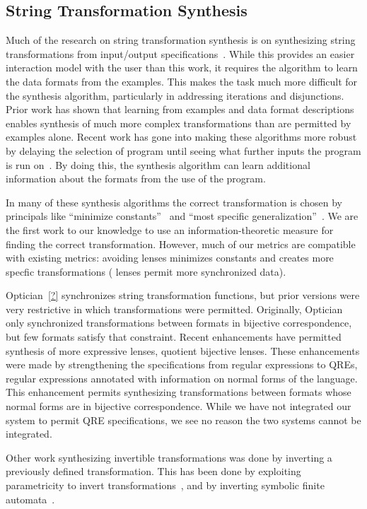 \documentclass[acmsmall,screen,anonymous]{acmart}
\begin{document}
\subsection{String Transformation Synthesis}
Much of the research on string transformation synthesis is on synthesizing
string transformations from input/output
specifications~\cite{flashfill,flashextract,?}. While this provides an easier
interaction model with the user than this work, it requires the algorithm to
learn the data formats from the examples. This makes the task much more
difficult for the synthesis algorithm, particularly in addressing iterations and
disjunctions. Prior work has shown that learning from examples and data format
descriptions enables synthesis of much more complex transformations than are
permitted by examples alone. Recent work has gone into making these algorithms
more robust by delaying the selection of program until seeing what further
inputs the program is run on~\cite{?}. By doing this, the synthesis algorithm
can learn additional information about the formats from the use of the program.

In many of these synthesis algorithms the correct transformation is chosen by
principals like ``minimize constants''~\cite{?,?,?} and ``most specific
generalization''~\cite{?,?,?}. We are the first work to our knowledge to use an
information-theoretic measure for finding the correct transformation. However,
much of our metrics are compatible with existing metrics: avoiding \Disconnect
lenses minimizes constants and creates more specfic transformations (\Disconnect
lenses permit more synchronized data).

Optician~\ref{?} synchronizes string transformation functions, but prior
versions were very restrictive in which transformations were permitted.
Originally, Optician only synchronized transformations between formats in
bijective correspondence, but few formats satisfy that constraint. Recent
enhancements have permitted synthesis of more expressive lenses, quotient
bijective lenses. These enhancements were made by strengthening the
specifications from regular expressions to QREs, regular expressions annotated
with information on normal forms of the language. This enhancement permits
synthesizing transformations between formats whose normal forms are in bijective
correspondence. While we have not integrated our system to permit QRE
specifications, we see no reason the two systems cannot be integrated.

Other work synthesizing invertible transformations was done by inverting a
previously defined transformation.  This has been done by exploiting
parametricity to invert transformations~\cite{?}, and by inverting symbolic
finite automata~\cite{?}.
\end{document}
